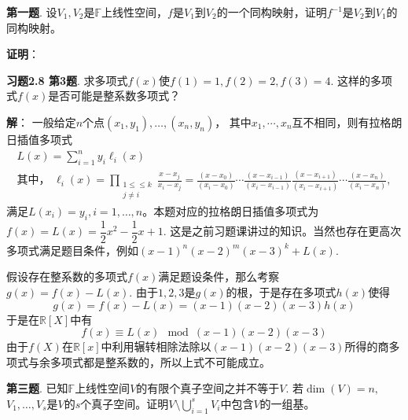 
\renewcommand{\newpageorvspace}{\vspace{2em}}

\date{2022-10-待定  第三次习题课}
\author{}



\maketitle


{\bf 第一题}. 设$V_1, V_2$是$\mathbb{F}$上线性空间，$f$是$V_1$到$V_2$的一个同构映射，证明$f^{-1}$是$V_2$到$V_1$的同构映射。

\newpageorvspace

{\bf 证明}： 

\newpageorvspace

{\bf 习题2.8 第3题}. 求多项式$f(x)$使$f(1) = 1, f(2) = 2, f(3) = 4.$ 这样的多项式$f(x)$是否可能是整系数多项式？

\newpageorvspace

{\bf 解}： 一般给定$n$个点$(x_1,y_1), \dots, (x_n,y_n)$， 其中$x_1, \cdots, x_n$互不相同，则有拉格朗日插值多项式
\begin{gather*}
L(x) = \sum_{i=1}^{n}y_{i}\ell_{i}(x) \\
\text{其中， } \ell_{i}(x) = \prod_{\begin{smallmatrix}1\leq \leq k \\ j\neq i\end{smallmatrix}}{\frac {x-x_{j}}{x_{i}-x_{j}}}={\frac {(x-x_{0})}{(x_{i}-x_{0})}}\cdots {\frac {(x-x_{i-1})}{(x_{i}-x_{i-1})}}{\frac {(x-x_{i+1})}{(x_{i}-x_{i+1})}}\cdots {\frac {(x-x_{n})}{(x_{i}-x_{n})}},
\end{gather*}
满足$L(x_i) = y_i, i=1, \dots ,n$。本题对应的拉格朗日插值多项式为$f(x) = L(x) = \dfrac{1}{2}x^2 - \dfrac{1}{2}x + 1$. 这是之前习题课讲过的知识。当然也存在更高次多项式满足题目条件，例如$(x-1)^n(x-2)^m(x-3)^k + L(x)$.

假设存在整系数的多项式$f(x)$满足题设条件，那么考察$g(x) = f(x) - L(x).$ 由于$1, 2, 3$是$g(x)$的根，于是存在多项式$h(x)$使得
$$g(x) = f(x) - L(x) = (x-1)(x-2)(x-3) h(x)$$
于是在$\mathbb{R}[X]$中有
$$f(x) \equiv L(x) \mod (x-1)(x-2)(x-3)$$
由于$f(X)$在$\mathbb{R}[x]$中利用辗转相除法除以$(x-1)(x-2)(x-3)$所得的商多项式与余多项式都是整系数的，所以上式不可能成立。

\newpageorvspace

{\bf 第三题}. 已知$\mathbb{F}$上线性空间$V$的有限个真子空间之并不等于$V.$ 若$\dim(V) = n,$ $V_1, \ldots, V_s$是$V$的$s$个真子空间。证明$\displaystyle V \setminus \bigcup_{i=1}^s V_i$中包含$V$的一组基。

